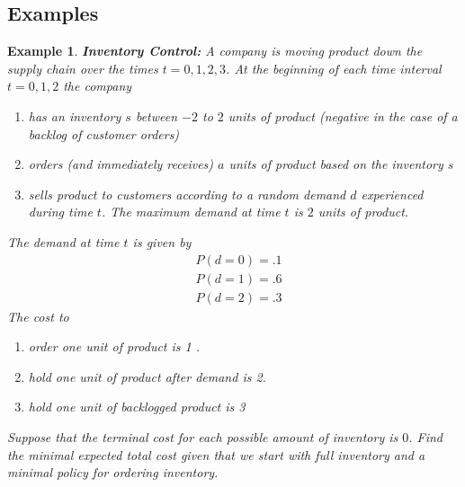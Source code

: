 \documentclass[12pt]{amsart}
\newtheorem{exm}[thm]{Example}
\begin{document}
\subsection{Examples}

\begin{exm}{\textbf{Inventory Control:}} 
A company is moving product down the supply chain over the times $t=0, 1, 2, 3$. At the beginning of each time interval $t = 0, 1, 2$ the company 

\begin{enumerate}
\item has an inventory $s$ between $-2$ to $2$ units of product (negative in the case of a backlog of customer orders) 
\item orders (and immediately receives) $a$ units of product based on the inventory $s$
\item sells product to customers according to a random demand $d$ experienced during time $t$. The maximum demand at time $t$ is $2$ units of product.
\end{enumerate}
The demand at time $t$ is given by
\begin{align*}
&P(d=0) = .1\\
&P(d=1) = .6\\
&P(d=2) = .3
\end{align*} 
The cost to
\begin{enumerate}
\item  order one unit of product is 1 .
\item  hold one unit of product after demand is 2.
\item  hold one unit of backlogged product is 3
\end{enumerate}
Suppose that the terminal cost for each possible amount of inventory is $0$. Find the minimal expected total cost given that we start with full inventory and a minimal policy for ordering inventory.
\end{exm}
\end{document}
